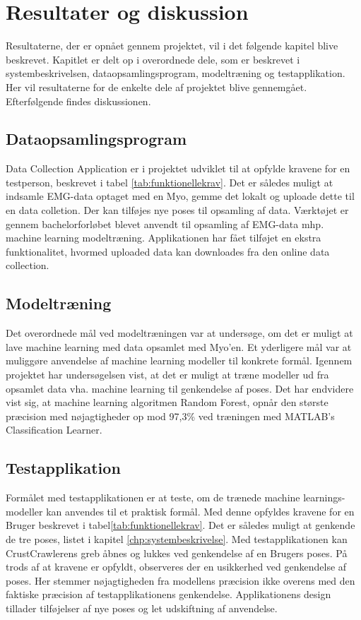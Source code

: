 \thispagestyle{fancy}
\chapter{Resultater og diskussion}
\label{chp:resultaterogdisk}

Resultaterne, der er opnået gennem projektet, vil i det følgende kapitel blive beskrevet. Kapitlet er delt op i overordnede dele, som er beskrevet i systembeskrivelsen, dataopsamlingsprogram, modeltræning og testapplikation. Her vil resultaterne for de enkelte dele af projektet blive gennemgået. Efterfølgende findes diskussionen.

\section{Dataopsamlingsprogram}
Data Collection Application er i projektet udviklet til at opfylde kravene for en testperson, beskrevet i tabel \ref{tab:funktionellekrav}. Det er således muligt at indsamle EMG-data optaget med en Myo, gemme det lokalt og uploade dette til en data colletion. Der kan tilføjes nye poses til opsamling af data.
Værktøjet er gennem bachelorforløbet blevet anvendt til opsamling af EMG-data mhp. machine learning modeltræning.
Applikationen har fået tilføjet en ekstra funktionalitet, hvormed uploaded data kan downloades fra den online data collection.

\section{Modeltræning}
Det overordnede mål ved modeltræningen var at undersøge, om det er muligt at lave machine learning med data opsamlet med Myo’en. Et yderligere mål var at muliggøre anvendelse af machine learning modeller til konkrete formål.
Igennem projektet har undersøgelsen vist, at det er muligt at træne modeller ud fra opsamlet data vha. machine learning til genkendelse af poses. Det har endvidere vist sig, at machine learning algoritmen Random Forest, opnår den største præcision med nøjagtigheder op mod 97,3\% ved træningen med MATLAB’s Classification Learner.

\section{Testapplikation}
Formålet med testapplikationen er at teste, om de trænede machine learnings-modeller kan anvendes til et praktisk formål. Med denne opfyldes kravene for en Bruger beskrevet i tabel\ref{tab:funktionellekrav}. Det er således muligt at genkende de tre poses, listet i kapitel \ref{chp:systembeskrivelse}. Med testapplikationen kan CrustCrawlerens greb åbnes og lukkes ved genkendelse af en Brugers poses.
På trods af at kravene er opfyldt, observeres der en usikkerhed ved genkendelse af poses. Her stemmer nøjagtigheden fra modellens præcision ikke overens med den faktiske præcision af testapplikationens genkendelse. Applikationens design tillader tilføjelser af nye poses og let udskiftning af anvendelse.

